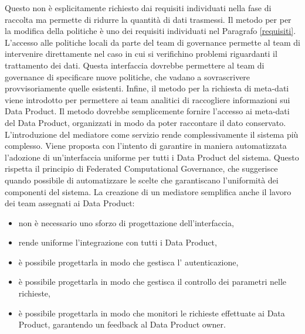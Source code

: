 \documentclass[a4paper,12pt]{report}
\begin{document}
Questo non è esplicitamente richiesto dai requisiti individuati nella fase di raccolta ma permette di ridurre la quantità di dati trasmessi.
Il metodo per per la modifica della politiche è uno dei requisiti individuati nel Paragrafo \ref{requisiti}.
L'accesso alle politiche locali da parte del team di governance permette al team di intervenire direttamente nel caso in cui si verifichino problemi riguardanti il trattamento dei dati.
Questa interfaccia dovrebbe permettere al team di governance di specificare nuove politiche, che vadano a sovrascrivere provvisoriamente quelle esistenti.
Infine, il metodo per la richiesta di meta-dati viene introdotto per permettere ai team analitici di raccogliere informazioni sui Data Product.
Il metodo dovrebbe semplicemente fornire l'accesso ai meta-dati del Data Product, organizzati in modo da poter raccontare il dato conservato.
L'introduzione del mediatore come servizio rende complessivamente il sistema più complesso.
Viene proposta con l'intento di garantire in maniera automatizzata l'adozione di un'interfaccia uniforme per tutti i Data Product del sistema.
Questo rispetta il principio di Federated Computational Governance, che suggerisce quando possibile di automatizzare le scelte che garantiscano l'uniformità dei componenti del sistema.
La creazione di un mediatore semplifica anche il lavoro dei team assegnati ai Data Product:
\begin{itemize}
    \item non è necessario uno sforzo di progettazione dell'interfaccia, 
    \item rende uniforme l'integrazione con tutti i Data Product,
    \item è possibile progettarla in modo che gestisca l' autenticazione,
    \item è possibile progettarla in modo che gestisca il controllo dei parametri nelle richieste,
    \item è possibile progettarla in modo che monitori le richieste effettuate ai Data Product, garantendo un feedback al Data Product owner.
\end{itemize}
\end{document}
